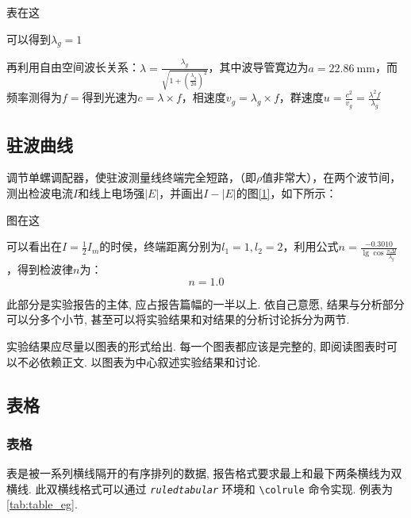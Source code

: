 \documentclass[font=fandol]{mpltx}
\newcommand{\note}[1]{{\color{gray}#1}}
\newcommand*\cs[1]{\texttt{\textbackslash #1}}
\newcommand*\env[1]{\textit{\texttt{#1}}}
\begin{document}
表在这

可以得到$\lambda_g= 1$

再利用自由空间波长关系：$\lambda=\frac{\lambda_g}{\sqrt{1+(\frac{\lambda_g}{2a})^2}}$，其中波导管寛边为$a=\qty{22.86}{\mm}$，而频率测得为$f=$得到光速为$c=\lambda\times f$，相速度$v_g=\lambda_g\times f$，群速度$u=\frac{c^2}{v_g}=\frac{\lambda^2f}{\lambda_g}$

\subsection{驻波曲线}
调节单螺调配器，使驻波测量线终端完全短路，（即$\rho$值非常大），在两个波节间，测出检波电流$I$和线上电场强$|E|$，并画出$I-|E|$的图\ref{1}，如下所示：

图在这

可以看出在$I=\frac{1}{2}I_m$的时侯，终端距离分别为$l_1=1,l_2=2$，利用公式$n=\frac{-0.3010}{\lg{\cos{\frac{\pi\Delta l}{\lambda_g}}}}$，得到检波律$n$为：
$$n=1.0$$

此部分是实验报告的主体, 应占报告篇幅的一半以上.
\note{依自己意愿, 结果与分析部分可以分多个小节, 甚至可以将实验结果和对结果的分析讨论拆分为两节.}

实验结果应尽量以图表的形式给出. 每一个图表都应该是完整的, 即阅读图表时可以不必依赖正文.
以图表为中心叙述实验结果和讨论.

\subsection{表格}\label{ssec:table}
\subsubsection{表格}\label{sssec:table}


表是被一系列横线隔开的有序排列的数据, 报告格式要求最上和最下两条横线为双横线.
\note{此双横线格式可以通过 \env{ruledtabular} 环境和 \cs{colrule} 命令实现.}
例表为\autoref{tab:table_eg}.
\end{document}
